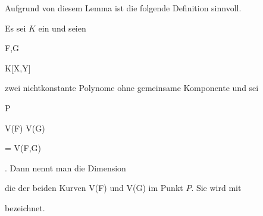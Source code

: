 Aufgrund von diesem Lemma ist die folgende Definition sinnvoll.



{}

{


Es sei $K$ ein
und seien


\mavergleichskette

{\vergleichskette

{F,G
}

{ \in }{ K[X,Y]
}

{  }{
}

{    }{
}

{   }{
}

}
{}{}{}
zwei nichtkonstante Polynome ohne gemeinsame Komponente und sei


\mavergleichskettedisp

{\vergleichskette

{ P
}

{ \in} { V(F) \cap V(G)
}

{ =} { V(F,G)
}

{ } {
}

{ } {
}

}
{}{}{.}
Dann nennt man die Dimension


 {  }


die  der beiden Kurven
\mathkor {} {V(F)} {und} {V(G)} {}
im Punkt $P$. Sie wird mit


 {  }


bezeichnet.


}



